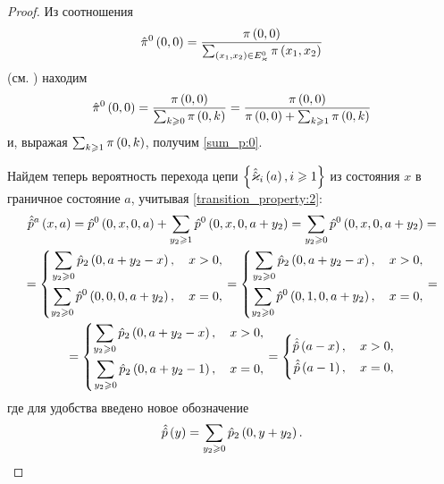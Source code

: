 \documentclass[a4paper,14pt,russian]{article}
\newcommand{\Markkhatoa}[0]{\brrr{ \hat{\hat{\vk}}_i\br{a}, i \geqslant 1}}
\newcommand{\p}{\hat{p}}
\begin{document}
\begin{proof}


Из соотношения 
\begin{equation*}
 \hat{\pi}^0 \left(0, 0\right) = \frac{\pi \left(0, 0\right)}{\sum_{\left(x_1,x_2\right) \in E^0_{\varkappa}}{\pi \left(x_1, x_2\right)}}
\end{equation*}
(см. \cite[с. 142]{Kemeny}) находим
\begin{equation*}
  \hat{\pi}^0 \left(0, 0\right) = \frac{\pi \left(0, 0\right)}{\sum_{k\geqslant 0}{\pi \left(0, k\right)}} =
  \frac{\pi \left(0, 0\right)}{\pi \left(0, 0\right) + \sum_{k\geqslant 1}{\pi \left(0, k\right)}}
\end{equation*}
и, выражая $\sum_{k\geqslant 1}{\pi \left(0, k\right)}$, получим \eqref{sum_p:0}.

Найдем теперь вероятность перехода цепи $\Markkhatoa$ из состояния $x$ в граничное состояние $a$, учитывая \eqref{transition_property:2}:
\begin{multline}
 \hat{\p}^a\br{x,a} = \p^0\br{0,x,0,a} + \sum_{y_2 \geqslant 1}\p^0\br{0,x,0,a+y_2} = \sum_{y_2 \geqslant 0} \p^0\br{0,x,0,a+y_2} = \\=
\left\{ 
\begin{align}
  \sum_{y_2 \geqslant 0} \p_2\br{0,a+y_2 - x}, \quad x > 0,\\
 \sum_{y_2 \geqslant 0} \p^0\br{0,0,0,a+y_2} , \quad x = 0,
\end{align}
\right.=
\left\{ 
\begin{align}
  \sum_{y_2 \geqslant 0} \p_2\br{0,a+y_2 - x}, \quad x > 0,\\
 \sum_{y_2 \geqslant 0} \p^0\br{0,1,0,a+y_2} , \quad x = 0,
\end{align}
\right.
=\\=
\left\{ 
\begin{align}
  \sum_{y_2 \geqslant 0} \p_2\br{0,a+y_2 - x}, \quad x > 0,\\
 \sum_{y_2 \geqslant 0} \p_2\br{0,a+y_2 - 1} , \quad x = 0,
\end{align}
\right.
=
\left\{ 
\begin{align}
 \hat{\p}\br{a-x}, \quad x > 0,\\
 \hat{\p}\br{a-1} , \quad x = 0,
\end{align}
\right.
\label{nested_rek}
\end{multline}
где для удобства введено новое обозначение 
\begin{equation}
\hat{\p}\br{y} = \sum_{y_2 \geqslant 0} \p_2\br{0,y+y_2}.
\label{hathatp}
\end{equation}


\end{proof}
\end{document}
